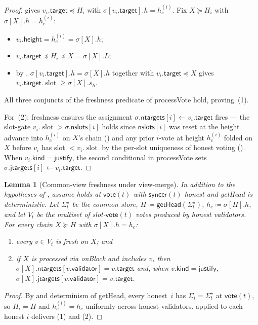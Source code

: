 \documentclass{article}
\newcommand{\slot}[0]{\ensuremath{\operatorname{\mathrm{slot}}}}
\newcommand{\target}{\mathsf{target}}
\newcommand{\kind}{\mathsf{kind}}
\newcommand{\height}{\mathsf{height}}
\newcommand{\validator}{\mathsf{validator}}
\newcommand{\just}{\ensuremath{\mathsf{justify}}\xspace}
\newcommand{\jtargets}{\mathsf{jtargets}}
\newcommand{\ntargets}{\mathsf{ntargets}}
\newcommand{\nslots}{\mathsf{nslots}}
\newcommand{\syncer}{\mathsf{syncer}}
\newcommand{\vote}{\mathsf{vote}}
\newcommand{\processVote}{\textsf{processVote}\xspace}
\newcommand{\onBlock}{\textsf{onBlock}\xspace}
\newcommand{\getHead}{\textsf{getHead}\xspace}
\theoremstyle{plain}
\newtheorem{lemma}{Lemma}
\theoremstyle{definition}
\theoremstyle{remark}
\begin{document}
\begin{proof}
 gives $v_i.\target \preceq H_i$ with $\sigma[v_i.\target].h = h_c^{(i)}$.
Fix $X \succeq H_i$ with $\sigma[X].h = h_c^{(i)}$:
\begin{itemize}
  \item $v_i.\height = h_c^{(i)} = \sigma[X].h$;
  \item $v_i.\target \preceq H_i \preceq X = \sigma[X].L$;
  \item by , $\sigma[v_i.\target].h = \sigma[X].h$ together with $v_i.\target \preceq X$ gives $v_i.\target.\slot \geq \sigma[X].s_h$.
\end{itemize}
All three conjuncts of the freshness predicate of \processVote hold, proving~(1).

For~(2): freshness ensures the assignment $\sigma.\ntargets[i] \gets v_i.\target$ fires --- the slot-gate $v_i.\slot > \sigma.\nslots[i]$ holds since $\nslots[i]$ was reset at the height advance into $h_c^{(i)}$ on $X$'s chain () and any prior $i$-vote at height $h_c^{(i)}$ folded on $X$ before $v_i$ has slot $< v_i.\slot$ by the per-slot uniqueness of honest voting ().
When $v_i.\kind = \just$, the second conditional in \processVote sets $\sigma.\jtargets[i] \gets v_i.\target$.
\end{proof}

\begin{lemma}[Common-view freshness under view-merge]\label{lem:freshness-honest-global}
In addition to the hypotheses of , assume  holds at $\vote(t)$ with $\syncer(t)$ honest and \getHead is deterministic.
Let $\Sigma^\star_t$ be the common store, $H \coloneqq \getHead(\Sigma^\star_t)$, $h_c \coloneqq \sigma[H].h$, and let $V_t$ be the multiset of slot-$\vote(t)$ votes produced by honest validators.
For every chain $X \succeq H$ with $\sigma[X].h = h_c$:
\begin{enumerate}
  \item every $v \in V_t$ is fresh on $X$; and
  \item if $X$ is processed via \onBlock and includes $v$, then $\sigma[X].\ntargets[v.\validator] = v.\target$ and, when $v.\kind = \just$, $\sigma[X].\jtargets[v.\validator] = v.\target$.
\end{enumerate}
\end{lemma}

\begin{proof}
By  and determinism of \getHead, every honest~$i$ has $\Sigma_i = \Sigma^\star_t$ at $\vote(t)$, so $H_i = H$ and $h_c^{(i)} = h_c$ uniformly across honest validators.
 applied to each honest $i$ delivers (1) and (2).
\end{proof}
\end{document}
